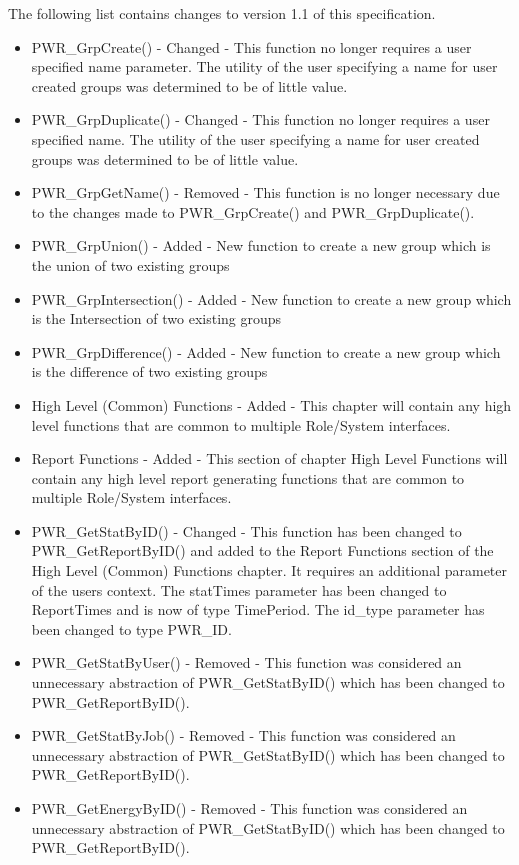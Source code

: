 \documentclass[12pt]{report} %
\begin{document}
\begin{appendices}
The following list contains changes to version 1.1 of this specification.

\begin{itemize}
    \item{PWR_GrpCreate() -  Changed - This function no longer requires a user specified name parameter. The utility of the user specifying a name for user created groups was determined to be of little value.}
    \item{PWR_GrpDuplicate() -  Changed - This function no longer requires a user specified name. The utility of the user specifying a name for user created groups was determined to be of little value.}
    \item{PWR_GrpGetName() - Removed - This function is no longer necessary due to the changes made to PWR_GrpCreate() and PWR_GrpDuplicate().}
    \item{PWR_GrpUnion() - Added - New function to create a new group which is the  union of two existing groups}
    \item{PWR_GrpIntersection() - Added - New function to create a new group which is the Intersection of two existing groups}
    \item{PWR_GrpDifference() - Added - New function to create a new group which is the difference of two existing groups}
    \item{High Level (Common) Functions - Added - This chapter will contain any high level functions that are common to multiple Role/System interfaces.}
    \item{Report Functions -   Added - This section of chapter High Level Functions will contain any high level report generating functions that are common to multiple Role/System interfaces.}
    \item{PWR_GetStatByID() - Changed - This function has been changed to PWR_GetReportByID() and added to the Report Functions section of the High Level (Common) Functions chapter. It requires an additional parameter of the users context. The statTimes parameter has been changed to ReportTimes and is now of type TimePeriod.  The id_type parameter has been changed to type PWR_ID. } 
    \item{PWR_GetStatByUser() - Removed - This function was considered an unnecessary abstraction of PWR_GetStatByID() which has been changed to PWR_GetReportByID().}
    \item{PWR_GetStatByJob() - Removed - This function was considered an unnecessary abstraction of PWR_GetStatByID() which has been changed to PWR_GetReportByID().}
    \item{PWR_GetEnergyByID() - Removed - This function was considered an unnecessary abstraction of PWR_GetStatByID() which has been changed to PWR_GetReportByID().}

\end{itemize}
\end{appendices}
\end{document}
